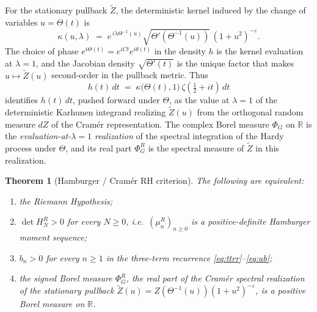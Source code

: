 \documentclass[11pt]{amsart}
\newtheorem{theorem}{Theorem}
\theoremstyle{definition}
\begin{document}
For the stationary pullback $\widetilde{Z}$, the deterministic kernel
induced by the change of variables $u=\Theta(t)$ is
\[
\kappa(u,\lambda)\;=\;e^{\,i\lambda\Theta^{-1}(u)}\sqrt{\Theta'(\Theta^{-1}(u))}\,(1+u^{2})^{-\varepsilon}.
\]
The choice of phase $e^{i\Theta(t)}=e^{iCt}e^{i\theta(t)}$ in the density $h$
is the kernel evaluation at $\lambda=1$, and the Jacobian density
$\sqrt{\Theta'(t)}$ is the unique factor that makes $u\mapsto\widetilde{Z}(u)$
second-order in the pullback metric. Thus
\[
h(t)\,dt\;=\;\kappa\bigl(\Theta(t),1\bigr)\,\zeta(\tfrac12+it)\,dt
\]
identifies $h(t)\,dt$, pushed forward under $\Theta$, as the value at
$\lambda=1$ of the deterministic Karhunen integrand realizing
$\widetilde{Z}(u)$ from the orthogonal random measure $dZ$ of the
Cram\'er representation. The complex Borel measure $\Phi_{G}$ on
$\mathbb{R}$ is the \emph{evaluation-at-$\lambda=1$ realization} of the
spectral integration of the Hardy process under $\Theta$, and its real
part $\Phi_{G}^{R}$ is the spectral measure of $\widetilde{Z}$ in this
realization.

\begin{theorem}[Hamburger / Cram\'er RH criterion]\label{thm:RH}
The following are equivalent:
\begin{enumerate}
\item[\textup{(i)}] the Riemann Hypothesis;
\item[\textup{(ii)}] $\det H_{N}^{R}>0$ for every $N\ge 0$, i.e.\ $(\mu_{n}^{R})_{n\ge 0}$ is a positive-definite Hamburger moment sequence;
\item[\textup{(iii)}] $b_{n}>0$ for every $n\ge 1$ in the three-term recurrence \eqref{eq:ttrr}--\eqref{eq:ab};
\item[\textup{(iv)}] the signed Borel measure $\Phi_{G}^{R}$, the real part of the Cram\'er spectral realization of the stationary pullback $\widetilde{Z}(u)=Z(\Theta^{-1}(u))(1+u^{2})^{-\varepsilon}$, is a positive Borel measure on $\mathbb{R}$.
\end{enumerate}
\end{theorem}
\end{document}
